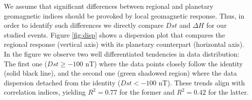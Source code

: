 \documentclass[a4paper,fleqn]{cas-dc}
\begin{document}
We assume that significant differences between regional and planetary geomagnetic indices should be provoked by local geomagnetic response. Thus, in order to identify such
differences we directly compare $Dst$ and $\Delta H$ for our studied events. Figure \ref{fig:disp} shows a dispersion plot that compares the regional response (vertical axis) with its planetary counterpart (horizontal axis). In the figure we observe two well differentiated tendencies in data distribution: The first one ($Dst \geq -100$ nT) where the data points closely follow the identity (solid black line), and the second one (green shadowed region) where the data dispersion detached from the identity ($Dst < -100$ nT). These trends align with correlation indices, yielding $R^2=0.77$ for the former and $R^2=0.42$ for the latter.




\end{document}

